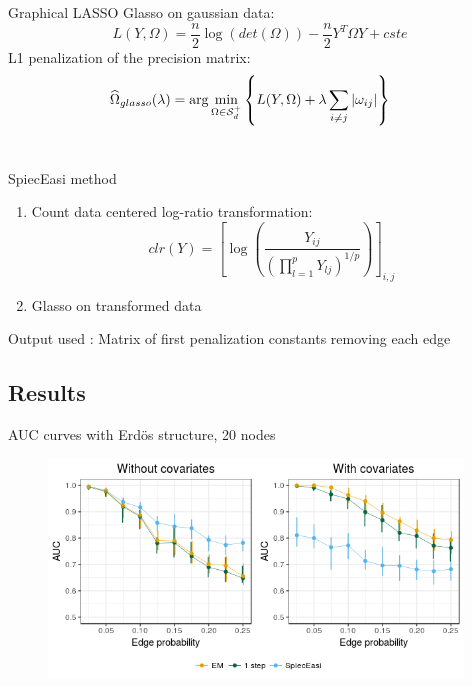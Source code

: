 \documentclass[9pt]{beamer}
\newcommand{\emphase}[1]{\textcolor{Complement}{#1}}
\begin{document}
\begin{frame}{Graphical LASSO}
\emphase{Glasso on gaussian data:}\\
	 \[L(Y,\Omega) = \frac{n}{2}\log(det(\Omega))-\frac{n}{2} Y^T\Omega Y + cste\]
L1 penalization of the precision matrix: \[\widehat{\Omega}_{glasso}(\lambda) = \arg\min_{\Omega \in \mathcal{S}_d^+}\left\{ L(Y,\Omega)+\lambda \sum_{i\neq j} |\omega_{ij}| \right\} \hspace{0.5cm} \]\\

	 \begin{block}{SpiecEasi method \cite{kurtz}}
	 \begin{enumerate}
	     \item Count data centered log-ratio transformation:
	     \[ clr(Y) = \left[ \log \left( \frac{Y_{ij}}{\left( \prod_{l=1}^p Y_{lj} \right)^{1/p}}\right)\right]_{i,j}\]
	     \item Glasso on transformed data
	 \end{enumerate}
	 Output used : Matrix of first penalization constants removing each edge
	 \end{block}
    
\end{frame}
\subsection{Results}

\begin{frame}{AUC curves with Erdös structure, 20 nodes}
\begin{figure}[htp]
\centering
\includegraphics[width=11cm]{mosaic.png}
\end{figure}
\end{frame}
\end{document}
